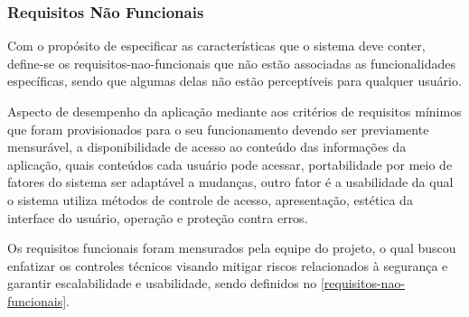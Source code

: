 \subsubsection{Requisitos Não Funcionais}
Com o propósito de especificar as características que o sistema deve conter, define-se os \gls{requisitos-nao-funcionais} que não estão associadas as funcionalidades específicas, sendo que algumas delas não estão perceptíveis para qualquer usuário. 

Aspecto de desempenho da aplicação mediante aos critérios de requisitos mínimos que foram provisionados para o seu funcionamento devendo ser previamente mensurável, a disponibilidade de acesso ao conteúdo das informações da aplicação, quais conteúdos cada usuário pode acessar, portabilidade por meio de fatores do sistema ser adaptável a mudanças, outro fator é a usabilidade da qual o sistema utiliza métodos de controle de acesso, apresentação, estética da interface do usuário, operação e proteção contra erros.

Os requisitos funcionais foram mensurados pela equipe do projeto, o qual buscou enfatizar os controles técnicos visando mitigar riscos relacionados à segurança e garantir escalabilidade e usabilidade, sendo definidos no \autoref{requisitos-nao-funcionais}.
    
